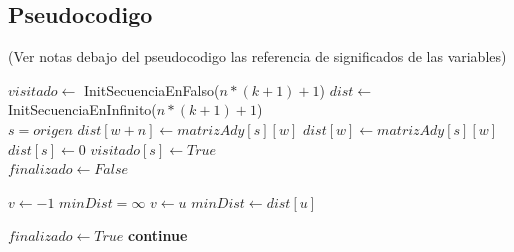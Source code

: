 \subsection{Pseudocodigo}

(Ver notas debajo del pseudocodigo las referencia de significados de las variables)

\begin{algorithm}[H]
\begin{algorithmic}
    
	\State $visitado \gets$ InitSecuenciaEnFalso($n*(k+1)+1$)    
	\State $dist \gets$ InitSecuenciaEnInfinito($n*(k+1)+1$)     \\

	\State $s = origen$    
	    
		    
			    
				    
					\State $dist[w+n] \gets matrizAdy[s][w]$    
				\EndIf
			\Else
				\State $dist[w] \gets matrizAdy[s][w]$    
			\EndIf
		\EndIf
	\EndFor \\

	\State $dist[s] \gets 0$    
	\State $visitado[s] \gets True$     \\

	\State $finalizado \gets False$    

	    
		\State $v \gets -1$    
		\State $minDist = \infty$    
		    
			    
				\State $v \gets u$    
				\State $minDist \gets dist[u]$    
			\EndIf
		\EndFor

		    
			\State $finalizado \gets True$    
			\State \textbf{continue} 
		\EndIf \\


\end{algorithmic}
\end{algorithm}
